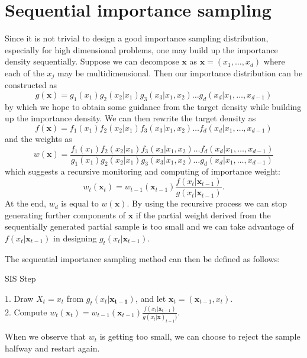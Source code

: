 \documentclass[times, utf8, diplomski]{fer}
\begin{document}
\section{Sequential importance sampling}
Since it is not trivial to design a good importance sampling distribution, especially for high dimensional problems, one may build up the importance density sequentially. Suppose we can decompose $\mathbf{x}$ as $\mathbf{x} = (x_1, \ldots, x_d)$ where each of the $x_j$ may be multidimensional. Then our importance distribution can be constructed as 
\begin{equation}
g(\mathbf{x}) = g_1(x_1) g_2(x_2 | x_1) g_3(x_3 | x_1, x_2) \ldots g_d(x_d | x_1, \ldots, x_{d - 1})
\end{equation}
by which we hope to obtain some guidance from the target density while building up the  importance density. We can then rewrite the target density as 
\begin{equation}
f(\mathbf{x}) = f_1(x_1) f_2(x_2 | x_1) f_3(x_3 | x_1, x_2) \ldots f_d(x_d | x_1, \ldots, x_{d - 1})
\end{equation}
and the weights as 
\begin{equation}
w(\mathbf{x}) = \frac{f_1(x_1) f_2(x_2 | x_1) f_3(x_3 | x_1, x_2) \ldots f_d(x_d | x_1, \ldots, x_{d - 1})}{g_1(x_1) g_2(x_2 | x_1) g_3(x_3 | x_1, x_2) \ldots g_d(x_d | x_1, \ldots, x_{d - 1})}
\end{equation}
which suggests a recursive monitoring and computing of importance weight:
\begin{equation}
w_t(\mathbf{x}_t) = w_{t - 1}(\mathbf{x}_{t - 1})\frac{f(x_t | \mathbf{x}_{t - 1})}{g(x_t | \mathbf{x}_{t - 1})}.    
\end{equation}
At the end, $w_d$ is equal to $w(\mathbf{x})$. By using the recursive process we can stop generating further components of $\mathbf{x}$ if the partial weight derived from the sequentially generated partial sample is too small and we can take advantage of $f(x_t | \mathbf{x}_{t - 1})$ in designing $g_t(x_t | \mathbf{x}_{t - 1})$.

The sequential importance sampling method can then be defined as follows:

\vspace{5mm}
\begin{algorithm}[H]
\caption{SIS Step}
$1.$ Draw $X_t=x_t$ from $g_t(x_t | \mathbf{x_{t-1}})$, and let $\mathbf{x}_t = (\mathbf{x}_{t - 1}, x_t)$.\\
$2.$ Compute $w_t(\mathbf{x}_t) = w_{t - 1}(\mathbf{x}_{t - 1})\frac{f(x_t | \mathbf{x}_{t - 1})}{g(x_t | \mathbf{x})_{t - 1})}$.\\
\label{SIS_step}
\end{algorithm}
\vspace{5mm}
When we observe that $w_t$ is getting too small, we can choose to reject the sample halfway and restart again.
\end{document}
